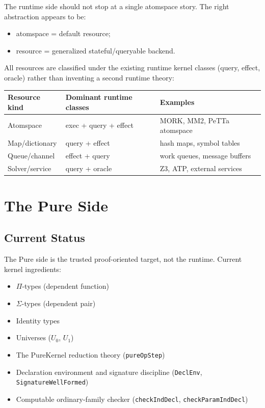 \documentclass[11pt]{article}
\theoremstyle{remark}
\newcommand{\MORK}{\textup{MORK}}
\newcommand{\PeTTa}{\textup{PeTTa}}
\newcommand{\leanref}[1]{\texttt{#1}}
\begin{document}
\medskip\noindent
The runtime side should not stop at a single atomspace story.
The right abstraction appears to be:

\begin{itemize}
  \item atomspace = default resource;
  \item resource = generalized stateful/queryable backend.
\end{itemize}

\noindent
All resources are classified under the existing runtime kernel classes
(query, effect, oracle) rather than inventing a second runtime theory:

\begin{center}
\begin{tabular}{@{}lll@{}}
\toprule
Resource kind & Dominant runtime classes & Examples \\
\midrule
Atomspace & exec + query + effect & \MORK{}, MM2, \PeTTa{} atomspace \\
Map/dictionary & query + effect & hash maps, symbol tables \\
Queue/channel & effect + query & work queues, message buffers \\
Solver/service & query + oracle & Z3, ATP, external services \\
\bottomrule
\end{tabular}
\end{center}

\section{The Pure Side}
\label{sec:pure}

\subsection{Current Status}

The Pure side is the trusted proof-oriented target, not the runtime.
Current kernel ingredients:

\begin{itemize}[nosep]
  \item $\Pi$-types (dependent function)
  \item $\Sigma$-types (dependent pair)
  \item Identity types
  \item Universes ($U_0$, $U_1$)
  \item The PureKernel reduction theory (\leanref{pureOpStep})
  \item Declaration environment and signature discipline
  (\leanref{DeclEnv}, \leanref{SignatureWellFormed})
  \item Computable ordinary-family checker
  (\leanref{checkIndDecl}, \leanref{checkParamIndDecl})
\end{itemize}
\end{document}

